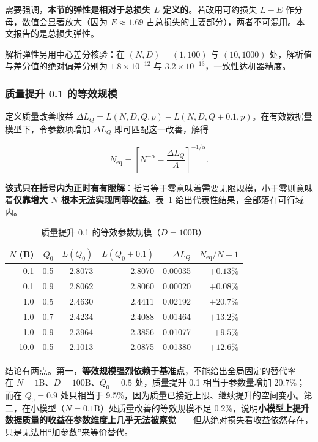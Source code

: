 需要强调，\textbf{本节的弹性是相对于总损失 $L$ 定义的}。若改用可约损失 $L-E$ 作分母，数值会显著放大（因为 $E\approx1.69$ 占总损失的主要部分），两者不可混用。本文报告的是总损失弹性。

解析弹性另用中心差分核验：在 $(N,D)=(1,100)$ 与 $(10,1000)$ 处，解析值与差分值的绝对偏差分别为 $1.8\times10^{-12}$ 与 $3.2\times10^{-13}$，一致性达机器精度。

\subsubsection{质量提升 0.1 的等效规模}

定义质量改善收益 $\Delta L_Q=L(N,D,Q,p)-L(N,D,Q+0.1,p)$。在有效数据量模型下，令参数项增加 $\Delta L_Q$ 即可匹配这一改善，解得

\begin{equation}
N_{\mathrm{eq}}=\left[N^{-\alpha}-\frac{\Delta L_Q}{A}\right]^{-1/\alpha}.
\label{eq:Neq}
\end{equation}

\textbf{该式只在括号内为正时有有限解}：括号等于零意味着需要无限规模，小于零则意味着\textbf{仅靠增大 $N$ 根本无法实现同等收益}。表~\ref{tab:q2_eq} 给出代表性结果，全部落在可行域内。

\begin{table}[htbp]
\centering
\caption{质量提升 0.1 的等效参数规模（$D=100$B）}
\label{tab:q2_eq}
\small
\begin{tabular}{r|r|r|r|r|r}
\toprule
$N$ (B) & $Q_0$ & $L(Q_0)$ & $L(Q_0+0.1)$ & $\Delta L_Q$ & $N_{\mathrm{eq}}/N-1$ \\
\midrule
0.1 & 0.5 & 2.8073 & 2.8070 & 0.00035 & $+0.13\%$ \\
0.1 & 0.9 & 2.8062 & 2.8060 & 0.00020 & $+0.08\%$ \\
1.0 & 0.5 & 2.4630 & 2.4411 & 0.02192 & $+20.7\%$ \\
1.0 & 0.7 & 2.4234 & 2.4088 & 0.01464 & $+13.2\%$ \\
1.0 & 0.9 & 2.3964 & 2.3856 & 0.01077 & $+9.5\%$ \\
10.0 & 0.5 & 2.1013 & 2.0875 & 0.01380 & $+12.6\%$ \\
\bottomrule
\end{tabular}
\end{table}

结论有两点。第一，\textbf{等效规模强烈依赖于基准点}，不能给出全局固定的替代率——在 $N=1$B、$D=100$B、$Q_0=0.5$ 处，质量提升 0.1 相当于参数量增加 20.7\%；而在 $Q_0=0.9$ 处只相当于 9.5\%，因为质量已接近上限、继续提升的空间变小。第二，在小模型（$N=0.1$B）处质量改善的等效规模不足 0.2\%，说明\textbf{小模型上提升数据质量的收益在参数维度上几乎无法被察觉}——但从绝对损失看收益依然存在，只是无法用``加参数''来等价替代。


